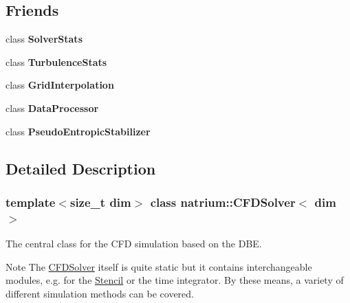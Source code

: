 \subsection*{Friends}
\begin{DoxyCompactItemize}
\item 
\hypertarget{classnatrium_1_1CFDSolver_a077a2603e5a09310a68f71b538415f46}{
class {\bfseries SolverStats}}
\label{classnatrium_1_1CFDSolver_a077a2603e5a09310a68f71b538415f46}

\item 
\hypertarget{classnatrium_1_1CFDSolver_a9e02a35cca963a424cefdfcb10da0ae2}{
class {\bfseries TurbulenceStats}}
\label{classnatrium_1_1CFDSolver_a9e02a35cca963a424cefdfcb10da0ae2}

\item 
\hypertarget{classnatrium_1_1CFDSolver_a1c3d409128c8407e63df35854c90c16a}{
class {\bfseries GridInterpolation}}
\label{classnatrium_1_1CFDSolver_a1c3d409128c8407e63df35854c90c16a}

\item 
\hypertarget{classnatrium_1_1CFDSolver_aa6f06b52d887407954e9683fba72badc}{
class {\bfseries DataProcessor}}
\label{classnatrium_1_1CFDSolver_aa6f06b52d887407954e9683fba72badc}

\item 
\hypertarget{classnatrium_1_1CFDSolver_afadc72e105d5bc12e85b931feaf687e2}{
class {\bfseries PseudoEntropicStabilizer}}
\label{classnatrium_1_1CFDSolver_afadc72e105d5bc12e85b931feaf687e2}

\end{DoxyCompactItemize}


\subsection{Detailed Description}
\subsubsection*{template$<$size\_\-t dim$>$ class natrium::CFDSolver$<$ dim $>$}

The central class for the CFD simulation based on the DBE. \begin{DoxyNote}{Note}
The \hyperlink{classnatrium_1_1CFDSolver}{CFDSolver} itself is quite static but it contains interchangeable modules, e.g. for the \hyperlink{classnatrium_1_1Stencil}{Stencil} or the time integrator. By these means, a variety of different simulation methods can be covered. 
\end{DoxyNote}

